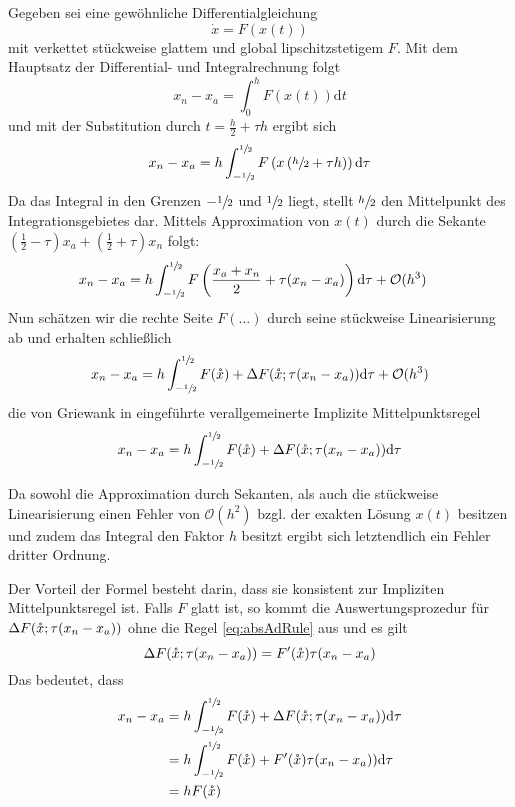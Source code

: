 Gegeben sei eine gewöhnliche Differentialgleichung
\[
 \dot x = F(x(t))
\]
mit verkettet stückweise glattem und global lipschitzstetigem $F$. Mit dem Hauptsatz der Differential- und Integralrechnung folgt
\[
 x_n - x_a = \int_0^h F(x(t)) \text{d}t
\]
und mit der Substitution durch $t = \frac{h}{2} + \tau h$ ergibt sich
\[
 x_n - x_a = h\int_{-\sfrac{1}{2}}^{\sfrac{1}{2}} F\left(x \left(\sfrac{h}{2} + \tau h\right)\right) \text{d}\tau
\]
Da das Integral in den Grenzen $-\sfrac{1}{2}$ und $\sfrac{1}{2}$ liegt, stellt $\sfrac{h}{2}$ den Mittelpunkt des Integrationsgebietes dar. Mittels Approximation von $x(t)$ durch die Sekante $(\frac{1}{2} - \tau) x_a + (\frac{1}{2} + \tau) x_n$ folgt:
\[
 \begin{aligned}
 x_n - x_a & = h\int_{-\sfrac{1}{2}}^{\sfrac{1}{2}} F\left(\frac{x_a + x_n}{2} + \tau (x_n - x_a)\right) \text{d}\tau + \mathcal O(h^3)
 \end{aligned}
\]
Nun schätzen wir die rechte Seite $F(\ldots)$ durch seine stückweise Linearisierung ab und erhalten schließlich
\[
 x_n -  x_a = h\int_{-\sfrac{1}{2}}^{\sfrac{1}{2}} F(\mathring{x}) + \Delta F(\mathring{x};\tau (x_n - x_a))  \text{d}\tau + \mathcal O(h^3)
\]
die von Griewank in \cite[S.21 (14)]{monster} eingeführte verallgemeinerte Implizite Mittelpunktsregel
\begin{equation}
 x_n -  x_a = h\int_{-\sfrac{1}{2}}^{\sfrac{1}{2}} F(\mathring{x}) + \Delta F(\mathring{x};\tau (x_n - x_a))  \text{d}\tau
 \label{eq:genMidpointRule}
\end{equation}

Da sowohl die Approximation durch Sekanten, als auch die stückweise Linearisierung einen Fehler von $\mathcal O(h^2)$ bzgl. der exakten Lösung $x(t)$ besitzen und zudem das Integral den Faktor $h$ besitzt ergibt sich letztendlich ein Fehler dritter Ordnung.

Der Vorteil der Formel besteht darin, dass sie konsistent zur Impliziten Mittelpunktsregel ist. Falls $F$ glatt ist, so kommt die Auswertungsprozedur für $\Delta F(\mathring{x};\tau (x_n - x_a))$ ohne die Regel \eqref{eq:absAdRule} aus und es gilt 
\[
 \Delta F(\mathring{x};\tau (x_n - x_a)) = F'(\mathring{x}) \tau (x_n - x_a)
\]
Das bedeutet, dass
\begin{equation}
\begin{aligned}
   x_n -  x_a &= h\int_{-\sfrac{1}{2}}^{\sfrac{1}{2}} F(\mathring{x}) + \Delta F(\mathring{x};\tau (x_n - x_a))  \text{d}\tau\\
		    &= h\int_{-\sfrac{1}{2}}^{\sfrac{1}{2}} F(\mathring{x}) + F'(\mathring{x})\tau (x_n - x_a))  \text{d}\tau\\
		    &= h F(\mathring{x})
\end{aligned}
\label{eq:equivalenceGenImplMidpoint}
\end{equation}

